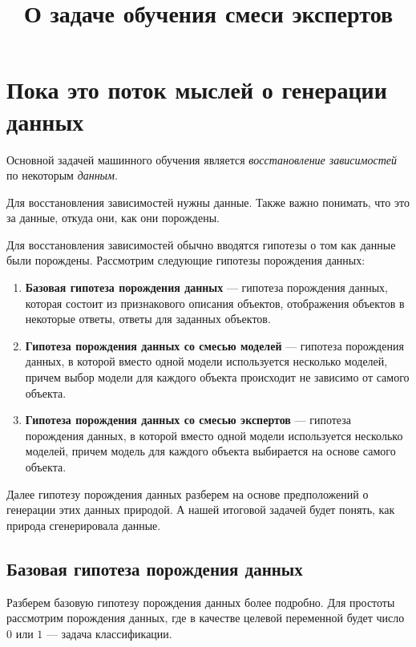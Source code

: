 \documentclass[12pt, twoside]{article}
\numberwithin{equation}{section}
\begin{document}
\title{\bf О задаче обучения смеси экспертов}
\date{}
\author{}
\maketitle

\section{Пока это поток мыслей о генерации данных}
Основной задачей машинного обучения является \textit{восстановление зависимостей} по некоторым \textit{данным}. 

Для восстановления зависимостей нужны данные. Также важно понимать, что это за данные, откуда они, как они порождены.

Для восстановления зависимостей обычно вводятся гипотезы о том как данные были порождены. Рассмотрим следующие гипотезы порождения данных:
\begin{enumerate}
	\item \textbf{Базовая гипотеза порождения данных} --- гипотеза порождения данных, которая состоит из признакового описания объектов, отображения объектов в некоторые ответы, ответы для заданных объектов.
	\item \textbf{Гипотеза порождения данных со смесью моделей} --- гипотеза порождения данных, в которой вместо одной модели используется несколько моделей, причем выбор модели для каждого объекта происходит не зависимо от самого объекта.
	\item \textbf{Гипотеза порождения данных со смесью экспертов} --- гипотеза порождения данных, в которой вместо одной модели используется несколько моделей, причем модель для каждого объекта выбирается на основе самого объекта.
\end{enumerate}

Далее гипотезу порождения данных разберем на основе предположений о генерации этих данных природой. А нашей итоговой задачей будет понять, как природа сгенерировала данные.

\subsection{Базовая гипотеза порождения данных}
Разберем базовую гипотезу порождения данных более подробно. Для простоты рассмотрим порождения данных, где в качестве целевой переменной будет число $0$ или $1$ --- задача классификации.
\end{document}

